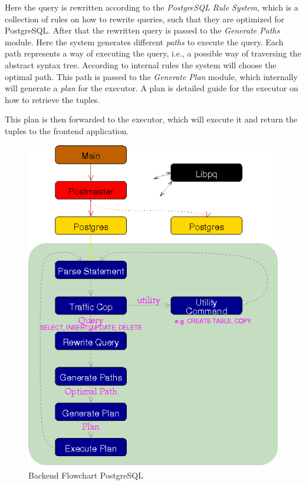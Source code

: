 Here the query is rewritten according to the \emph{PostgreSQL Rule System}, which is a collection of rules on how to rewrite queries, such that they are optimized for PostgreSQL.
%
After that the rewritten query is passed to the \emph{Generate Paths} module.
%
Here the system generates different \emph{paths} to execute the query.
%
Each path represents a way of executing the query, i.e., a possible way of traversing the abstract syntax tree.
%
According to internal rules the system will choose the optimal path.
%
This path is passed to the \emph{Generate Plan} module, which internally will generate a \emph{plan} for the executor.
%
A plan is detailed guide for the executor on how to retrieve the tuples.

This plan is then forwarded to the executor, which will execute it and return the tuples to the frontend application.
%
\begin{figure}[!ht]
  \centering
    \includegraphics[width=1\textwidth]{img/backend_flowchart.png}
    \caption{Backend Flowchart PostgreSQL \protect \footnotemark}\label{figure:postgresql:architecture}
\end{figure}
%
%
\FloatBarrier
